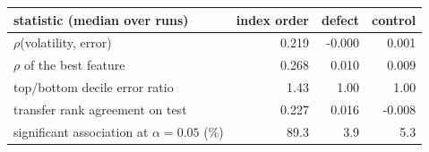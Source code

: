 \begin{tabular}{lrrr}
\toprule
statistic (median over runs) & index order & defect & control \\
\midrule
$\rho$(volatility, error) & 0.219 & -0.000 & 0.001 \\
$\rho$ of the best feature & 0.268 & 0.010 & 0.009 \\
top/bottom decile error ratio & 1.43 & 1.00 & 1.00 \\
transfer rank agreement on test & 0.227 & 0.016 & -0.008 \\
significant association at $\alpha=0.05$ (\%) & 89.3 & 3.9 & 5.3 \\
\bottomrule
\end{tabular}